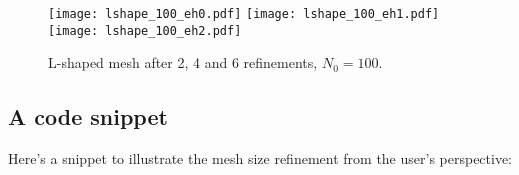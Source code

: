 \begin{figure}[!ht]
	\centering
	\texttt{[image: lshape\_100\_eh0.pdf]}
    \texttt{[image: lshape\_100\_eh1.pdf]}
    \texttt{[image: lshape\_100\_eh2.pdf]}
	\caption{L-shaped mesh after 2, 4 and 6 refinements, $N_0 = 100$.}
\end{figure}

\newpage
\subsection{A code snippet}

Here's a snippet to illustrate the mesh size refinement from the user's perspective:

